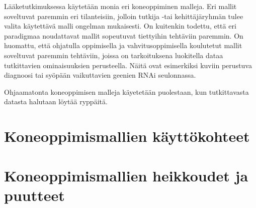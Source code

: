 \documentclass[finnish,twoside,censored,essay,sw-line]{HYthesisML}
\begin{document}
Lääketutkimuksessa käytetään monia eri koneoppiminen malleja. Eri mallit soveltuvat paremmin eri tilanteisiin,
jolloin tutkija -tai kehittäjäryhmän tulee valita käytettävä malli ongelman mukaisesti. On kuitenkin todettu, että
eri paradigmaa noudattavat mallit sopeutuvat tiettyihin tehtäviin paremmin. On huomattu, että ohjatulla oppimisella
ja vahvitusoppimisella koulutetut mallit soveltuvat paremmin tehtäviin, joissa on tarkoituksena luokitella
dataa tutkittavien ominaisuuksien perusteella. Näitä ovat esimerkiksi kuviin perustuva diagnoosi tai syöpään
vaikuttavien geenien RNAi seulonnassa.

Ohjaamatonta koneoppimisen malleja käyetetään puolestaan, kun tutkittavasta datasta halutaan löytää ryppäitä.


\chapter{Koneoppimismallien käyttökohteet}

\chapter{Koneoppimismallien heikkoudet ja puutteet}

\cleardoublepage
{}
{}
\printbibliography

\backmatter
\end{document}
